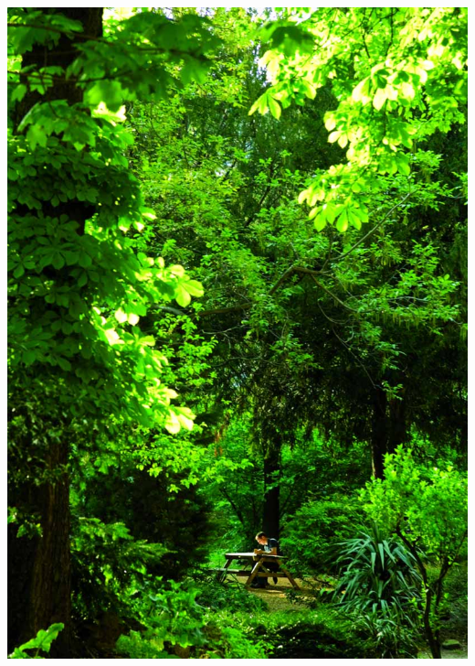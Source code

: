 \documentclass[slidestop,11pt,compress,serif]{beamer} %
\begin{document}
\begin{frame}[plain,t]
\begin{minipage}{.18\linewidth}
    \includegraphics[width=\linewidth]{images/ens-072}

    \bigskip
    \bigskip
    \bigskip
    \bigskip


\end{minipage}
\end{frame}
\end{document}
